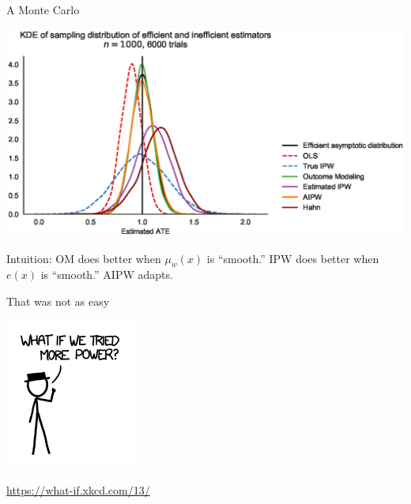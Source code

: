 \documentclass[10pt,aspectratio=169,handout]{beamer}
\theoremstyle{definition}
\begin{document}
\begin{frame}{A Monte Carlo}

  
  \begin{center}
    \includegraphics[height=0.8\textheight]{estimators.eps}
  \end{center}
  \scriptsize
  Intuition: OM does better when $\mu_w(x)$ is ``smooth.'' IPW does better
  when $e(x)$ is ``smooth.'' AIPW adapts. 
  
\end{frame}

\begin{frame}{That was not as easy}
  \begin{center}
  \includegraphics[height=0.5\textheight]{laser_pointer_more_power.png}
  
  \url{https://what-if.xkcd.com/13/}
\end{center}
\end{frame}
\end{document}
